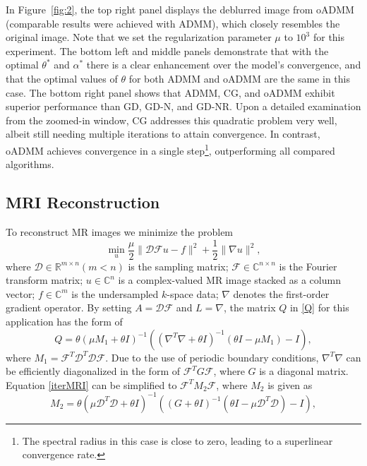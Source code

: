 \documentclass[letterpaper]{article} %
\begin{document}
In Figure~\ref{fig:2}, the top right panel displays the deblurred image from oADMM (comparable results were achieved with ADMM), which closely resembles the original image. Note that we set the regularization parameter $\mu$ to $10^3$ for this experiment. The bottom left and middle panels demonstrate that with the optimal $\theta^*$ and $\alpha^*$ there is a clear enhancement over the model's convergence, and that the optimal values of $\theta$ for both ADMM and oADMM are the same in this case. The bottom right panel shows that ADMM, CG, and oADMM exhibit superior performance than GD, GD-N, and GD-NR. Upon a detailed examination from the zoomed-in window, CG addresses this quadratic problem very well, albeit still needing multiple iterations to attain convergence. In contrast, oADMM achieves convergence in a single step\footnote{The spectral radius in this case is close to zero, leading to a superlinear convergence rate.}, outperforming all compared algorithms.

\subsection{MRI Reconstruction}
To reconstruct MR images we minimize the problem
\begin{equation}\label{MRIt2}
	\min\limits_{u}\frac{\mu}{2}\|\mathcal{D} \mathcal{F}u-f\|^2+\frac{1}{2}\|\nabla u\|^2,
\end{equation}
where $\mathcal{D}\in\mathbb{R}^{m\times n} \left(m<n\right)$ is the sampling matrix; $\mathcal{F}\in\mathbb{C}^{n\times n}$ is the Fourier transform matrix; $u\in\mathbb{C}^{n}$ is a complex-valued MR image stacked as a column vector; $f\in\mathbb{C}^{m}$  is the undersampled $k$-space data; $\nabla$ denotes the first-order gradient operator.
By setting $A=\mathcal{D} \mathcal{F}$ and $L=\nabla$, the matrix $Q$ in \eqref{Q} for this application has the form of
\begin{equation}\label{iterMRI}
	 Q=\theta(\mu M_1 +\theta I)^{-1} ( ( {\nabla^T}\nabla +\theta I)^{-1} (\theta I - \mu M_1  ) - I),
\end{equation}
where $M_1=\mathcal{F}^T \mathcal{D}^T \mathcal{D} \mathcal{F}$. Due to the use of periodic boundary conditions, $\nabla^T\nabla$ can be efficiently diagonalized in the form of $\mathcal{F}^T G \mathcal{F}$, where $G$ is a diagonal matrix. Equation \eqref{iterMRI} can be simplified to $\mathcal{F}^T M_2 \mathcal{F}$, where $M_2$ is given as
\begin{equation*}\label{iterdeblurring}
	 M_2 = \theta(\mu \mathcal{D}^T \mathcal{D}+\theta I)^{-1} ( ( G +\theta I)^{-1} (\theta I -  \mu \mathcal{D}^T \mathcal{D} ) - I),
\end{equation*}
\end{document}
